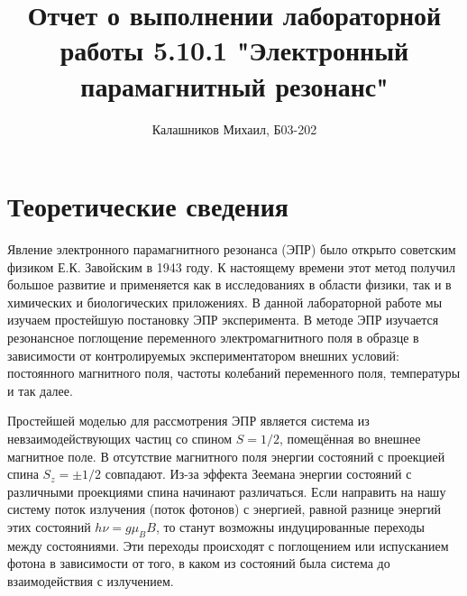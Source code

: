 \documentclass[14pt, a4paper]{report}
\title{\textbf{Отчет о выполнении лабораторной работы 5.10.1 "Электронный парамагнитный резонанс"}}
\author{Калашников Михаил, Б03-202}
\date{}
\begin{document}
\maketitle


\section{Теоретические сведения}

Явление электронного парамагнитного резонанса (ЭПР) было открыто советским физиком Е.К. Завойским в 1943 году. К настоящему времени этот метод получил большое развитие и применяется как в исследованиях в области физики, так и в химических и биологических приложениях. В данной лабораторной работе мы изучаем простейшую постановку ЭПР эксперимента.
В методе ЭПР изучается резонансное поглощение переменного электромагнитного поля в образце в зависимости от контролируемых экспериментатором внешних условий: постоянного магнитного поля, частоты колебаний переменного поля, температуры и так далее.

Простейшей моделью для рассмотрения ЭПР является система из невзаимодействующих частиц со спином $S=1/2$, помещённая во внешнее магнитное поле. В отсутствие магнитного поля энергии состояний с проекцией спина $S_z=\pm1/2$ совпадают. Из-за эффекта Зеемана энергии состояний с различными проекциями спина начинают различаться. Если направить на нашу систему поток излучения (поток фотонов) с энергией,
равной разнице энергий этих состояний $h\nu=g\mu_B B$, то станут возможны индуцированные переходы между состояниями. Эти переходы происходят с поглощением или испусканием фотона в зависимости от того, в каком из состояний была система до взаимодействия с излучением.
\end{document}

